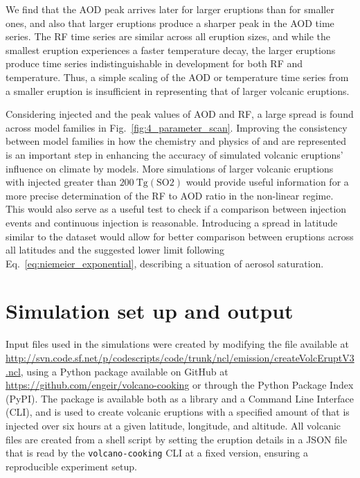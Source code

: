 \documentclass[draft]{agujournal2019}
\newcommand{\iso}[1][i]{{#1}njected \ce{SO2}}
\begin{document}
We find that the AOD peak arrives later for larger eruptions than for smaller ones, and
also that larger eruptions produce a sharper peak in the AOD time series. The RF time
series are similar across all eruption sizes, and while the smallest eruption
experiences a faster temperature decay, the larger eruptions produce time series
indistinguishable in development for both RF and temperature. Thus, a simple scaling of
the AOD or temperature time series from a smaller eruption is insufficient in
representing that of larger volcanic eruptions.

Considering \iso{} and the peak values of AOD and RF, a large spread is found across
model families in Fig.~\ref{fig:4_parameter_scan}. Improving the consistency between
model families in how the chemistry and physics of  and  are
represented is an important step in enhancing the accuracy of simulated volcanic
eruptions' influence on climate by models. More simulations of larger volcanic eruptions
with \iso{} greater than \(\SI{200}{\tera\gram(\mathrm{SO2})}\) would provide useful
information for a more precise determination of the RF to AOD ratio in the non-linear
regime. This would also serve as a useful test to check if a comparison between 
injection events and continuous  injection is reasonable. Introducing a spread
in latitude similar to the  dataset would allow for better
comparison between eruptions across all latitudes and the suggested lower limit
following Eq.~\ref{eq:niemeier_exponential}, describing a situation of aerosol
saturation.


%
%
%
%
\appendix
\section{Simulation set up and output}

Input files used in the simulations were created by modifying the file available at
\url{http://svn.code.sf.net/p/codescripts/code/trunk/ncl/emission/createVolcEruptV3.ncl},
using a Python package available on GitHub at
\url{https://github.com/engeir/volcano-cooking} or through the Python Package Index
(PyPI). The package is available both as a library and a Command Line Interface (CLI),
and is used to create volcanic eruptions with a specified amount of  that is
injected over six hours at a given latitude, longitude, and altitude. All volcanic
 files are created from a shell script by setting the eruption details in a JSON
file that is read by the \texttt{volcano-cooking} CLI at a fixed version, ensuring a
reproducible experiment setup.
\end{document}
